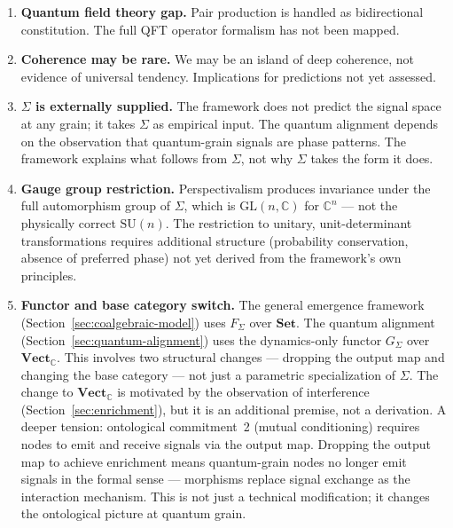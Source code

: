 \documentclass[12pt,a4paper]{article}
\begin{document}
\begin{enumerate}
  \item \label{pp:qft-gap} \textbf{Quantum field theory gap.} Pair production is handled as bidirectional constitution. The full QFT operator formalism has not been mapped.

  \item \label{pp:coherence-rare} \textbf{Coherence may be rare.} We may be an island of deep coherence, not evidence of universal tendency. Implications for predictions not yet assessed.

  \item \label{pp:sigma-external} \textbf{$\Sigma$ is externally supplied.} The framework does not predict the signal space at any grain; it takes $\Sigma$ as empirical input. The quantum alignment depends on the observation that quantum-grain signals are phase patterns. The framework explains what follows from $\Sigma$, not why $\Sigma$ takes the form it does.

  \item \label{pp:gauge-restriction} \textbf{Gauge group restriction.} Perspectivalism produces invariance under the full automorphism group of $\Sigma$, which is $\text{GL}(n, \mathbb{C})$ for $\mathbb{C}^n$ --- not the physically correct $\text{SU}(n)$. The restriction to unitary, unit-determinant transformations requires additional structure (probability conservation, absence of preferred phase) not yet derived from the framework's own principles.

  \item \label{pp:functor-switch} \textbf{Functor and base category switch.} The general emergence framework (Section~\ref{sec:coalgebraic-model}) uses $F_\Sigma$ over $\mathbf{Set}$. The quantum alignment (Section~\ref{sec:quantum-alignment}) uses the dynamics-only functor $G_\Sigma$ over $\mathbf{Vect}_{\mathbb{C}}$. This involves two structural changes --- dropping the output map and changing the base category --- not just a parametric specialization of $\Sigma$. The change to $\mathbf{Vect}_{\mathbb{C}}$ is motivated by the observation of interference (Section~\ref{sec:enrichment}), but it is an additional premise, not a derivation. A deeper tension: ontological commitment~2 (mutual conditioning) requires nodes to emit and receive signals via the output map. Dropping the output map to achieve enrichment means quantum-grain nodes no longer emit signals in the formal sense --- morphisms replace signal exchange as the interaction mechanism. This is not just a technical modification; it changes the ontological picture at quantum grain.


\end{enumerate}
\end{document}
